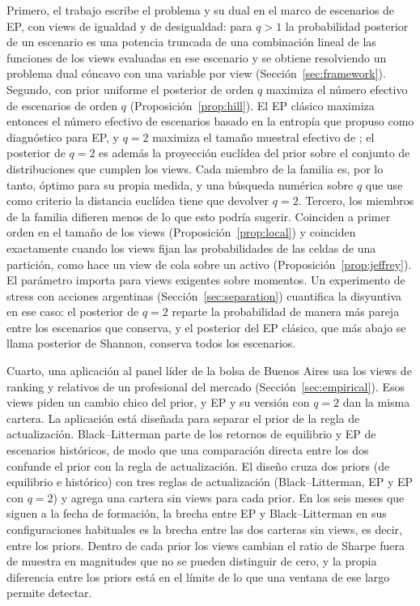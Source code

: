\documentclass[11pt]{article}
\begin{document}
Primero, el trabajo escribe el problema y su dual en el
marco de escenarios de EP, con views de igualdad y de desigualdad: para
$q>1$ la probabilidad posterior de un escenario es una potencia truncada de
una combinaci\'on lineal de las funciones de los views evaluadas en ese
escenario y se obtiene resolviendo un problema dual c\'oncavo con una
variable por view (Secci\'on~\ref{sec:framework}). Segundo, con prior
uniforme el posterior de orden $q$ maximiza el n\'umero efectivo de
escenarios de orden $q$ (Proposici\'on~\ref{prop:hill}). El EP cl\'asico
maximiza entonces el n\'umero efectivo de escenarios basado en la entrop\'ia
que \citet{Meucci2012} propuso como diagn\'ostico para EP, y $q=2$ maximiza
el tama\~no muestral efectivo de \citet{Kish1965}; el posterior de $q=2$ es
adem\'as la proyecci\'on eucl\'idea del prior sobre el conjunto de
distribuciones que cumplen los views. Cada miembro de la familia es, por lo
tanto, \'optimo para su propia medida, y una b\'usqueda num\'erica sobre $q$
que use como criterio la distancia eucl\'idea tiene que devolver $q=2$. Tercero, los
miembros de la familia difieren menos de lo que esto podr\'ia sugerir.
Coinciden a primer orden en el tama\~no de los views
(Proposici\'on~\ref{prop:local}) y coinciden exactamente cuando los views
fijan las probabilidades de las celdas de una partici\'on, como hace un view
de cola sobre un activo (Proposici\'on~\ref{prop:jeffrey}). El par\'ametro importa para views
exigentes sobre momentos. Un experimento de stress con acciones argentinas
(Secci\'on~\ref{sec:separation}) cuantifica la disyuntiva en ese caso: el
posterior de $q=2$ reparte la probabilidad de manera m\'as pareja entre los
escenarios que conserva, y el posterior del EP cl\'asico, que m\'as abajo se
llama posterior de Shannon, conserva todos los escenarios.

Cuarto, una aplicaci\'on al panel l\'ider de la bolsa de Buenos Aires usa los
views de ranking y relativos de un profesional del mercado
(Secci\'on~\ref{sec:empirical}). Esos views piden un cambio chico del prior,
y EP y su versi\'on con $q=2$ dan la misma cartera. La aplicaci\'on est\'a
dise\~nada para separar el prior de la regla de actualizaci\'on.
Black--Litterman parte de los retornos de equilibrio y EP de escenarios
hist\'oricos, de modo que una comparaci\'on directa entre los dos confunde el
prior con la regla de actualizaci\'on. El dise\~no cruza dos priors (de
equilibrio e hist\'orico) con tres reglas de actualizaci\'on
(Black--Litterman, EP y EP con $q=2$) y agrega una cartera sin views para
cada prior. En los seis meses que siguen a la fecha de formaci\'on, la
brecha entre EP y Black--Litterman en sus configuraciones habituales es la
brecha entre las dos carteras sin views, es decir, entre los priors.
Dentro de cada prior los views cambian el ratio de Sharpe fuera de muestra
en magnitudes que no se pueden distinguir de cero, y la propia diferencia
entre los priors est\'a en el l\'imite de lo que una ventana de ese largo
permite detectar.
\end{document}
